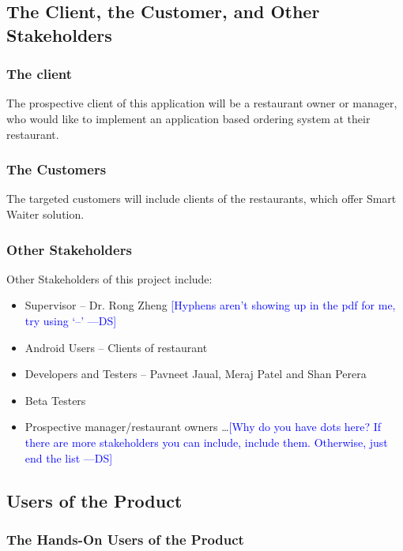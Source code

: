 \documentclass[12pt, titlepage]{article}
\newcommand{\authornote}[3]{\textcolor{#1}{[#3 ---#2]}}
\newcommand{\authornote}[3]{}
\newcommand{\ds}[1]{\authornote{blue}{DS}{#1}}
\begin{document}
\subsection{The Client, the Customer, and Other Stakeholders}
\subsubsection{The client}
The prospective client of this application will be a restaurant owner or manager, who would like to implement an application based ordering system at their restaurant.
\newline
\newline
\subsubsection{The Customers}
The targeted customers will include clients of the restaurants, which offer Smart Waiter solution.
\newline
\newline
\subsubsection{Other Stakeholders}
Other Stakeholders of this project include:
\begin{itemize}
  \item Supervisor – Dr. Rong Zheng \ds{Hyphens aren't showing up in the pdf for me, try using `--'}
  \item 	Android Users – Clients of restaurant
  \item 	Developers and Testers – Pavneet Jaual, Meraj Patel and Shan Perera
  \item 	Beta Testers
  \item Prospective manager/restaurant owners \ldots \ds{Why do you have dots here? If there are more stakeholders you can include, include them. Otherwise, just end the list}
\end{itemize}

\subsection{Users of the Product}
\subsubsection{The Hands-On Users of the Product}
\end{document}
